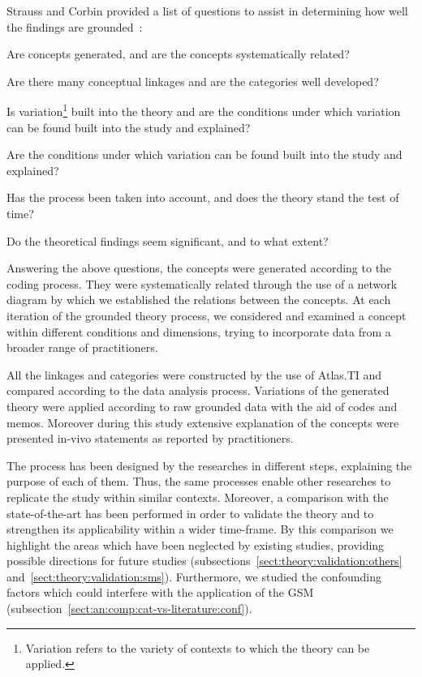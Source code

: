\documentclass[10pt,journal,letterpaper,compsoc]{IEEEtran}
\begin{document}
Strauss and Corbin provided a list of questions to assist in determining how
well the findings are grounded~\cite{Strauss1998}:

\begin{compactenum} 
\item Are concepts generated, and are the concepts systematically related? 
\item Are there many conceptual linkages and are the categories well developed? 
\item Is variation\footnote{Variation refers to the variety of contexts to 
which the theory can be applied.} built into the theory and are the conditions 
under which variation can be found built into the study and explained? 
\item Are the conditions under which variation can be found built into the 
study and explained? 
\item Has the process been taken into account, and does the theory stand the 
test of time? 
\item Do the theoretical findings seem significant, and to what extent? 
\end{compactenum}


Answering the above questions, the concepts were generated according to the
coding process. They were systematically related through the use of a network
diagram by which we established the relations between the concepts. At each 
iteration of the grounded theory process, we considered and examined a concept 
within different conditions and dimensions, trying to incorporate data from a 
broader range of practitioners.

All the linkages and categories were constructed by the use of Atlas.TI and
compared according to the data analysis process. Variations of the generated
theory were applied according to raw grounded data with the aid of codes and
memos. Moreover during this study extensive explanation of the concepts were
presented in-vivo statements as reported by practitioners.

The process has been designed by the researches in different steps, explaining
the purpose of each of them. Thus, the same processes enable other researches 
to replicate the study within similar contexts. Moreover, a comparison with the 
state-of-the-art has been performed in order to validate the theory and to 
strengthen its applicability within a wider time-frame. By this 
comparison we highlight the areas which have been neglected by
existing studies, providing possible directions for future studies
(subsections~\ref{sect:theory:validation:others} 
and~\ref{sect:theory:validation:sms}). Furthermore, we studied the
confounding factors which could interfere with the application of the GSM
(subsection~\ref{sect:an:comp:cat-vs-literature:conf}).
\end{document}
